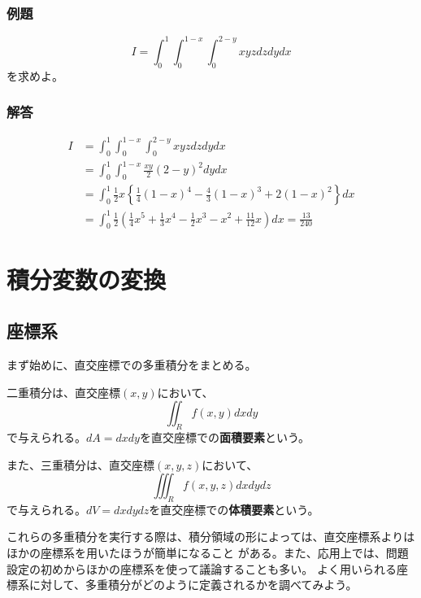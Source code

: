 \documentclass[a4j,dvipdfmx]{jsarticle}
\begin{document}
\subsubsection*{例題}
\begin{equation*}
    I=\int_0^1\int_0^{1-x}\int_0^{2-y}xyzdzdydx
\end{equation*}
を求めよ。

\subsubsection*{解答}
\begin{align*}
    I&=\int_0^1\int_0^{1-x}\int_0^{2-y}xyzdzdydx\\
     &=\int_0^1\int_0^{1-x}\frac{xy}{2}(2-y)^2dydx\\
     &=\int_0^1\frac{1}{2}x\left\{\frac{1}{4}(1-x)^4-\frac{4}{3}(1-x)^3+2(1-x)^2\right\}dx\\
     &=\int_0^1\frac{1}{2}\left(\frac{1}{4}x^5+\frac{1}{3}x^4-\frac{1}{2}x^3-x^2+\frac{11}{12}x\right)dx=\frac{13}{240}
\end{align*}

\section{積分変数の変換}
\subsection{座標系}
まず始めに、直交座標での多重積分をまとめる。

二重積分は、直交座標$(x,y)$において、
\begin{equation}
    \iint_R f(x,y)dxdy\label{6.15}
\end{equation}
で与えられる。$dA=dxdy$を直交座標での\textbf{面積要素}という。

また、三重積分は、直交座標$(x,y,z)$において、
\begin{equation}
    \iiint_R f(x,y,z)dxdydz\label{6.16}
\end{equation}
で与えられる。$dV=dxdydz$を直交座標での\textbf{体積要素}という。

これらの多重積分を実行する際は、積分領域の形によっては、直交座標系よりはほかの座標系を用いたほうが簡単になること
がある。また、応用上では、問題設定の初めからほかの座標系を使って議論することも多い。
よく用いられる座標系に対して、多重積分がどのように定義されるかを調べてみよう。
\end{document}
